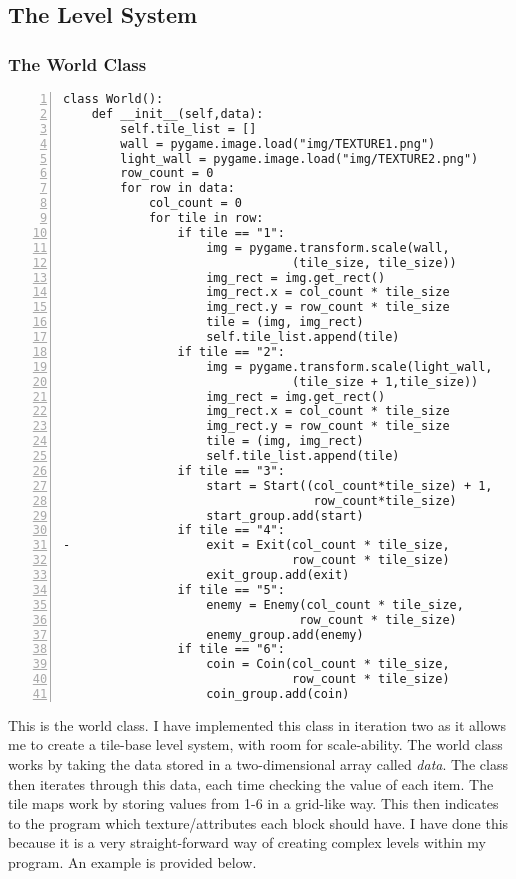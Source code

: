 \documentclass[12pt]{report}
\begin{document}
\pagebreak

\subsection{The Level System}
\subsubsection{The World Class}

\begin{Verbatim}[numbers=left, frame=single]
class World():
    def __init__(self,data):
        self.tile_list = []
        wall = pygame.image.load("img/TEXTURE1.png")                                   
        light_wall = pygame.image.load("img/TEXTURE2.png")
        row_count = 0
        for row in data:
            col_count = 0
            for tile in row:
                if tile == "1":
                    img = pygame.transform.scale(wall, 
                                (tile_size, tile_size))
                    img_rect = img.get_rect()
                    img_rect.x = col_count * tile_size
                    img_rect.y = row_count * tile_size
                    tile = (img, img_rect)
                    self.tile_list.append(tile)
                if tile == "2":
                    img = pygame.transform.scale(light_wall,
                                (tile_size + 1,tile_size))
                    img_rect = img.get_rect()
                    img_rect.x = col_count * tile_size
                    img_rect.y = row_count * tile_size 
                    tile = (img, img_rect)
                    self.tile_list.append(tile)
                if tile == "3":
                    start = Start((col_count*tile_size) + 1,
                                   row_count*tile_size)
                    start_group.add(start)
                if tile == "4":
-                   exit = Exit(col_count * tile_size,
                                row_count * tile_size)
                    exit_group.add(exit)
                if tile == "5":
                    enemy = Enemy(col_count * tile_size,
                                 row_count * tile_size)
                    enemy_group.add(enemy)
                if tile == "6":
                    coin = Coin(col_count * tile_size,
                                row_count * tile_size)
                    coin_group.add(coin)
\end{Verbatim}

\pagebreak

This is the world class. I have implemented this class in iteration two as it allows me to create a tile-base level system, with room for scale-ability. The world class works by taking the data stored in a two-dimensional array called \textit{data}. The class then iterates through this data, each time checking the value of each item. The tile maps work by storing values from 1-6 in a grid-like way. This then indicates to the program which texture/attributes each block should have. I have done this because it is a very straight-forward way of creating complex levels within my program. An example is provided below. 
\end{document}
